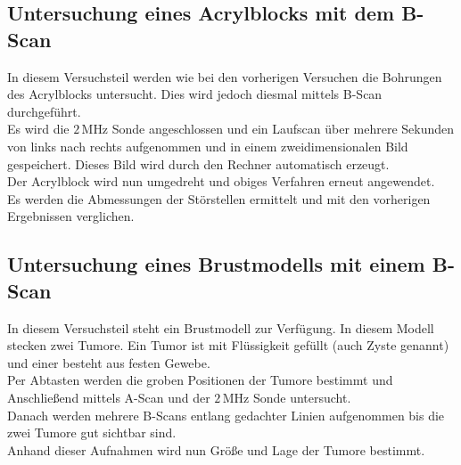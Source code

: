 \subsection{Untersuchung eines Acrylblocks mit dem B-Scan}

In diesem Versuchsteil werden wie bei den vorherigen Versuchen
die Bohrungen des Acrylblocks untersucht. Dies wird jedoch
diesmal mittels B-Scan durchgeführt.\\
Es wird die $2 \, \si{\mega\hertz}$ Sonde angeschlossen und ein
Laufscan über mehrere Sekunden von links nach rechts aufgenommen 
und in einem zweidimensionalen Bild gespeichert. Dieses Bild wird 
durch den Rechner automatisch erzeugt.\\
Der Acrylblock wird nun umgedreht und obiges Verfahren erneut
angewendet.\\
Es werden die Abmessungen der Störstellen ermittelt und mit den
vorherigen Ergebnissen verglichen.\\

\subsection{Untersuchung eines Brustmodells mit einem B-Scan}

In diesem Versuchsteil steht ein Brustmodell zur Verfügung.
In diesem Modell stecken zwei Tumore. Ein Tumor ist mit Flüssigkeit gefüllt (auch Zyste genannt)
und einer besteht aus festen Gewebe.\\
Per Abtasten werden die groben Positionen der Tumore bestimmt und 
Anschließend mittels A-Scan und der $2 \, \si{\mega\hertz}$ Sonde
untersucht.\\
Danach werden mehrere B-Scans entlang gedachter Linien
aufgenommen bis die zwei Tumore gut sichtbar sind.\\
Anhand dieser Aufnahmen wird nun Größe und Lage der Tumore bestimmt.\\